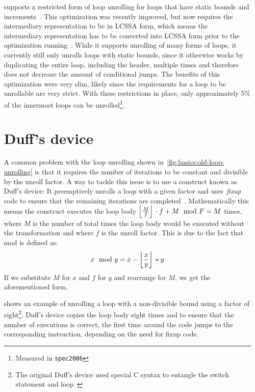 \libFIRM{} supports a restricted form of loop unrolling for loops that have static bounds and increments~\cite{helmer10studienarbeit}.
This optimization was recently improved, but now requires the intermediary representation to be in LCSSA form, which means the~\libFIRM{} intermediary representation has to be converted into LCSSA form prior to the optimization running~\cite{aebi18bachelorarbeit}.
While it supports unrolling of many forms of loops, it currently still only unrolls loops with static bounds, since it otherwise works by duplicating the entire loop, including the header, multiple times and therefore does not decrease the amount of conditional jumps.
The benefits of this optimization were very slim, likely since the requirements for a loop to be unrollable are very strict.
With these restrictions in place, only approximately 5\% of the innermost loops can be unrolled\footnote{Measured in \texttt{spec2006}}.




\section{Duff's device}\label{sec:basics:duffs}

A common problem with the loop unrolling shown in~\cref{fig:basics:old-loop-unrolling} is that it requires the number of iterations to be constant and divisible by the unroll factor.
A way to tackle this issue is to use a construct known as Duff's device: It preemptively unrolls a loop with a given factor and uses~\textit{fixup} code to ensure that the remaining iterations are completed~\cite{duff_1983}.
Mathematically this means the construct executes the loop body $\left\lfloor{}\frac{M}{f}\right\rfloor{} \cdot f + M \mod F = M$ times, where $M$ is the number of total times the loop body would be executed without the transformation and where $f$ is the unroll factor.
This is due to the fact that mod is defined as:
$$x \mod{} y = x - \left\lfloor{}\frac{x}{y}\right\rfloor{} * y$$
If we substitute $M$ for $x$ and $f$ for $y$ and rearrange for $M$, we get the aforementioned form.

 shows an example of unrolling a loop with a non-divisible bound using a factor of eight\footnote{The original Duff's device used special C syntax to entangle the switch statement and loop~\cite{duff_1983}}.
Duff's device copies the loop body eight times and to ensure that the number of executions is correct, the first time around the code jumps to the corresponding instruction, depending on the need for fixup code.


